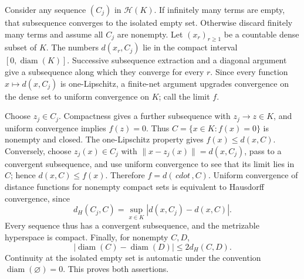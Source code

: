 Consider any sequence \((C_j)\) in \(\mathcal H(K)\).  If infinitely many terms are empty, that subsequence converges to the isolated empty set.  Otherwise discard finitely many terms and assume all \(C_j\) are nonempty.  Let \((x_r)_{r\ge1}\) be a countable dense subset of \(K\).  The numbers \(d(x_r,C_j)\) lie in the compact interval \([0,\operatorname{diam}(K)]\).  Successive subsequence extraction and a diagonal argument give a subsequence along which they converge for every \(r\).  Since every function \(x\mapsto d(x,C_j)\) is one-Lipschitz, a finite-net argument upgrades convergence on the dense set to uniform convergence on \(K\); call the limit \(f\).

Choose \(z_j\in C_j\).  Compactness gives a further subsequence with \(z_j\to z\in K\), and uniform convergence implies \(f(z)=0\).  Thus \(C=\{x\in K:f(x)=0\}\) is nonempty and closed.  The one-Lipschitz property gives \(f(x)\le d(x,C)\).  Conversely, choose \(z_j(x)\in C_j\) with \(\|x-z_j(x)\|=d(x,C_j)\), pass to a convergent subsequence, and use uniform convergence to see that its limit lies in \(C\); hence \(d(x,C)\le f(x)\).  Therefore \(f=d(\,cdot\,,C)\).  Uniform convergence of distance functions for nonempty compact sets is equivalent to Hausdorff convergence, since
\[
 d_H(C_j,C)=\sup_{x\in K}|d(x,C_j)-d(x,C)|.
\]
Every sequence thus has a convergent subsequence, and the metrizable hyperspace is compact.  Finally, for nonempty \(C,D\),
\[
 |\operatorname{diam}(C)-\operatorname{diam}(D)|\le2d_H(C,D).
\]
Continuity at the isolated empty set is automatic under the convention \(\operatorname{diam}(\varnothing)=0\).  This proves both assertions.